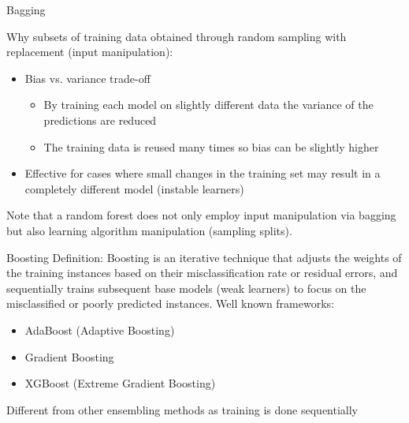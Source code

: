 \documentclass[11pt,compress,t,notes=noshow, aspectratio=169, xcolor=table]{beamer}
\begin{document}
\begin{vbframe}{Bagging}

Why subsets of training data obtained through random sampling with replacement (input manipulation):
\begin{itemize}
    \item Bias vs. variance trade-off
    \begin{itemize}
        \item By training each model on slightly different data the variance of the predictions are reduced
        \item The training data is reused many times so bias can be slightly higher  
    \end{itemize}
    \item Effective for cases where small changes in the training set may result in a completely different model (instable learners)
\end{itemize}
\vspace{1em}
Note that a random forest does not only employ input manipulation via bagging but also learning algorithm manipulation (sampling splits).

\end{vbframe}


\begin{vbframe}{Boosting}
Definition: Boosting is an iterative technique that adjusts the weights of the training instances based on their misclassification rate or residual errors, and sequentially trains subsequent base models (weak learners) to focus on the misclassified or poorly predicted instances.
\vspace{1em}
Well known frameworks:
\begin{itemize}
    \item AdaBoost (Adaptive Boosting)
    \item Gradient Boosting
    \item XGBoost (Extreme Gradient Boosting)
\end{itemize}
\vspace{1em}
Different from other ensembling methods as training is done sequentially

\end{vbframe}
\end{document}
